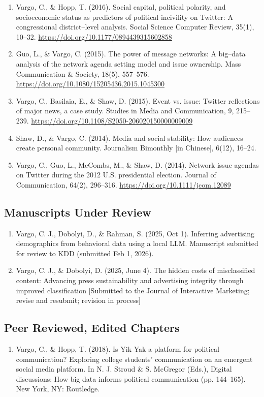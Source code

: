 \documentclass[11pt,letterpaper]{article}
\begin{document}
{\begin{enumerate}
\item Vargo, C., \& Hopp, T. (2016). Social capital, political polarity, and socioeconomic status as predictors of political incivility on Twitter: A congressional district--level analysis. Social Science Computer Review, 35(1), 10--32. \url{https://doi.org/10.1177/0894439315602858}
\item Guo, L., \& Vargo, C. (2015). The power of message networks: A big--data analysis of the network agenda setting model and issue ownership. Mass Communication \& Society, 18(5), 557--576. \url{https://doi.org/10.1080/15205436.2015.1045300}
\item Vargo, C., Basilaia, E., \& Shaw, D. (2015). Event vs. issue: Twitter reflections of major news, a case study. Studies in Media and Communication, 9, 215--239. \url{https://doi.org/10.1108/S2050-206020150000009009}
\item Shaw, D., \& Vargo, C. (2014). Media and social stability: How audiences create personal community. Journalism Bimonthly [in Chinese], 6(12), 16--24.
\item Vargo, C., Guo, L., McCombs, M., \& Shaw, D. (2014). Network issue agendas on Twitter during the 2012 U.S. presidential election. Journal of Communication, 64(2), 296--316. \url{https://doi.org/10.1111/jcom.12089}
\end{enumerate}
}
\subsection*{Manuscripts Under Review}
{\small
\begin{enumerate}
\item Vargo, C. J., Dobolyi, D., \& Rahman, S. (2025, Oct 1). Inferring advertising demographics from behavioral data using a local LLM. Manuscript submitted for review to KDD (submitted Feb 1, 2026).
\item Vargo, C. J., \& Dobolyi, D. (2025, June 4). The hidden costs of misclassified content: Advancing press sustainability and advertising integrity through improved classification [Submitted to the Journal of Interactive Marketing; revise and resubmit; revision in process]
\end{enumerate}
}
\subsection*{Peer Reviewed, Edited Chapters}
{\small
\begin{enumerate}
\item Vargo, C., \& Hopp, T. (2018). Is Yik Yak a platform for political communication? Exploring college students' communication on an emergent social media platform. In N. J. Stroud \& S. McGregor (Eds.), Digital discussions: How big data informs political communication (pp. 144--165). New York, NY: Routledge.
\end{enumerate}
}
\end{document}
